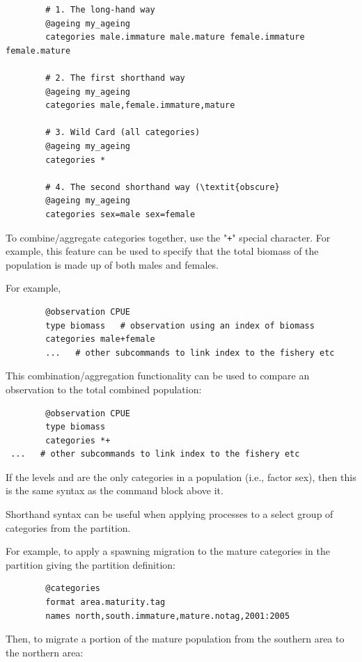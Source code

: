 {\small{\begin{verbatim}
		# 1. The long-hand way
		@ageing my_ageing
		categories male.immature male.mature female.immature female.mature

		# 2. The first shorthand way
		@ageing my_ageing
		categories male,female.immature,mature

		# 3. Wild Card (all categories)
		@ageing my_ageing
		categories *

		# 4. The second shorthand way (\textit{obscure}
		@ageing my_ageing
		categories sex=male sex=female
\end{verbatim}}}

To combine/aggregate categories together, use the "\texttt{+}" special character. For example, this feature can be used to specify that the total biomass of the population is made up of both males and females.

For example,

{\small{\begin{verbatim}
		@observation CPUE
		type biomass   # observation using an index of biomass
		categories male+female
        ...   # other subcommands to link index to the fishery etc
\end{verbatim}}}

This combination/aggregation functionality can be used to compare an observation to the total combined population:

{\small{\begin{verbatim}
		@observation CPUE
		type biomass
		categories *+
 ...   # other subcommands to link index to the fishery etc
		\end{verbatim}}}

If the levels  and  are the only categories in a population (i.e., factor sex), then this is the same syntax as the command block above it.

Shorthand syntax can be useful when applying processes to a select group of categories from the partition.

For example, to apply a spawning migration to the mature categories in the partition giving the partition definition:

{\small{\begin{verbatim}
		@categories
		format area.maturity.tag
		names north,south.immature,mature.notag,2001:2005
\end{verbatim}}}

Then, to migrate a portion of the mature population from the southern area to the northern area:

